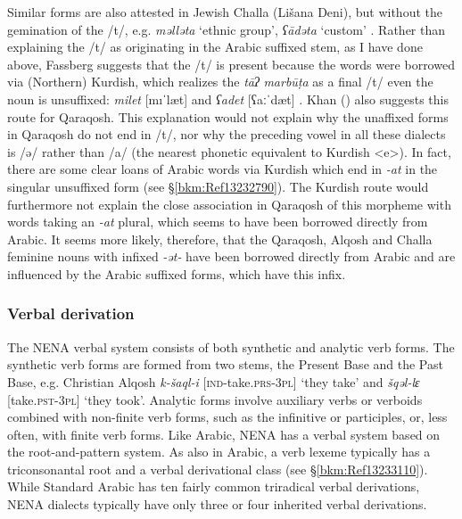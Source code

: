 \documentclass[output=paper]{langsci/langscibook}
\begin{document}
Similar forms are also attested in Jewish Challa (Lišana Deni), but without the gemination of the /t/, e.g. \textit{məlləta} ‘ethnic group’, \textit{ʕādəta} ‘custom’ \citep[52]{Fassberg2010}. Rather than explaining the /t/ as originating in the Arabic suffixed stem, as I have done above, Fassberg suggests that the /t/ is present because the words were borrowed via (Northern) Kurdish, which realizes the \textit{tāʔ} \textit{marbūṭa} as a final /t/ even the noun is unsuffixed: \textit{milet} [mıˈlæt] and \textit{ʕadet} [ʕaːˈdæt] \citep[387]{Chyet2003}. Khan (\citeyear[206]{Khan2002}) also suggests this route for Qaraqosh. This explanation would not explain why the unaffixed forms in Qaraqosh do not end in /t/, nor why the preceding vowel in all these dialects is /ə/ rather than /a/ (the nearest phonetic equivalent to Kurdish <e>). In fact, there are some clear loans of Arabic words via Kurdish which end in \textit{{}-at} in the singular unsuffixed form (see §\ref{bkm:Ref13232790}). The Kurdish route would furthermore not explain the close association in Qaraqosh of this morpheme with words taking an \textit{\nobreakdash-at} plural, which seems to have been borrowed directly from Arabic. It seems more likely, therefore, that the Qaraqosh, Alqosh and Challa feminine nouns with infixed \textit{\nobreakdash-ət\nobreakdash-} have been borrowed directly from Arabic and are influenced by the Arabic suffixed forms, which have this infix.

\subsubsection{\label{bkm:Ref13233345}Verbal derivation}

The NENA verbal system consists of both synthetic and analytic verb forms. The synthetic verb forms are formed from two stems, the Present Base and the Past Base, e.g. Christian Alqosh \textit{k\nobreakdash-šaql\nobreakdash-i} [\textsc{ind\nobreakdash-}take.\textsc{prs\nobreakdash-3pl]} ‘they take’ and \textit{šqəl\nobreakdash-lɛ} [take.\textsc{pst\nobreakdash-3pl}] ‘they took’. Analytic forms involve auxiliary verbs or verboids combined with non-finite verb forms, such as the infinitive or participles, or, less often, with finite verb forms. Like Arabic, NENA has a verbal system based on the root-and-pattern system. As also in Arabic, a verb lexeme typically has a triconsonantal root and a verbal derivational class (see §\ref{bkm:Ref13233110}). While Standard Arabic has ten fairly common triradical verbal derivations, NENA dialects typically have only three or four inherited verbal derivations.
\end{document}
